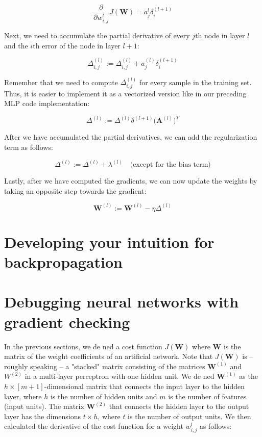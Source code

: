 \documentclass[letterpaper]{report}
\begin{document}
\[
\frac{\partial}{\partial w_{i, j}^{l}} J(\mathbf{W}) = a_{j}^{l} \delta_{i}^{(l+1)}
\]

Next, we need to accumulate the partial derivative of every $j$th node in layer $l$ and the $i$th error of the node in layer $l +1$:

\[
\Delta^{(l)}_{i, j} := \Delta_{i, j}^{(l)} + a_{j}^{(l)} \delta_{i}^{(l+1)}
\]

Remember that we need to compute $\Delta_{i, j}^{(l)}$ for every sample in the training set. Thus, it is easier to implement it as a vectorized version like in our preceding MLP code implementation:

\[
\Delta^{(l)} := \Delta^{(l)} \delta^{(l + 1)} \big( \mathbf{A}^{(l)}  \big)^T 
\]

After we have accumulated the partial derivatives, we can add the regularization term as follows:

\[
\Delta^{(l)} := \Delta^{(l)} + \lambda^{(l)} \quad \text{(except for the bias term)}
\]

Lastly, after we have computed the gradients, we can now update the weights by
taking an opposite step towards the gradient:

\[
\mathbf{W}^{(l)} := \mathbf{W}^{(l)} - \eta\Delta^{(l)} 
\]


\section{Developing your intuition for backpropagation}
\section{Debugging neural networks with gradient checking}

In the previous sections, we de ned a cost function $J(\mathbf{W})$ where $\mathbf{W}$ is the matrix
of the weight coefficients of an artificial network. Note that $J(\mathbf{W})$  is -- roughly speaking -- a "stacked" matrix consisting of the matrices $\mathbf{W}^{(1)}	$ and $W^{(2)}$ in a multi-layer perceptron with one hidden unit. We de ned $\mathbf{W}^{(1)}$ as the $h \times [m+1]$-dimensional matrix that connects the input layer to the hidden layer, where $h$ is the number of hidden units and $m$ is the number of features (input units). The matrix $\mathbf{W}^{(2)}$ that connects the hidden layer to the output layer has the dimensions $t \times h$, where $t$ is the number of output units. We then calculated the derivative of the cost function for a weight $w_{i, j}^{l}$ as follows:
\end{document}
